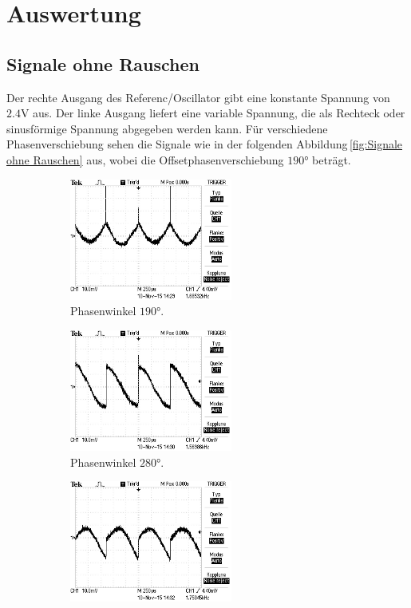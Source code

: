 \section{Auswertung}
\label{sec:Auswertung}
\subsection{Signale ohne Rauschen}
\label{sec:Signale ohne Rauschen}
Der rechte Ausgang des Referenc/Oscillator gibt eine konstante Spannung
von $2.4\si{\volt}$ aus. Der linke Ausgang liefert eine variable Spannung, die
als Rechteck oder sinusförmige Spannung abgegeben werden kann. Für verschiedene
Phasenverschiebung sehen die Signale wie in der folgenden
Abbildung\,\ref{fig:Signale ohne Rauschen} aus, wobei die Offsetphasenverschiebung
 $190°$ beträgt.
\begin{figure}
  \centering
  \begin{subfigure}{0.48\textwidth}
    \centering
    \includegraphics[height=4cm]{Bilder/or/or10.JPG}
    \caption{Phasenwinkel $190°$.}
    \label{fig:orp10}
  \end{subfigure}
  \begin{subfigure}{0.48\textwidth}
    \centering
    \includegraphics[height=4cm]{Bilder/or/or100.JPG}
    \caption{Phasenwinkel $280°$.}
    \label{fig:orp100}
  \end{subfigure}
  \begin{subfigure}{0.48\textwidth}
    \centering
    \includegraphics[height=4cm]{Bilder/or/or150.JPG}

\end{subfigure}
\end{figure}
